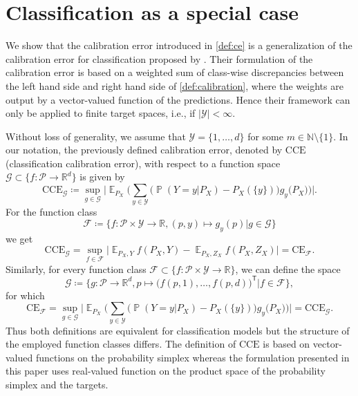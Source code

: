 \documentclass{article}
\DeclareMathOperator{\Prob}{\mathbb{P}}
\DeclareMathOperator{\Exp}{\mathbb{E}}
\begin{document}
\section{Classification as a special case}
\label{app:classification}

We show that the calibration error introduced in
\cref{def:ce} is a generalization of the calibration error
for classification proposed by \citet{Widmann2019}.
Their formulation of the calibration error is based on
a weighted sum of class-wise discrepancies between the
left hand side and right hand side of \cref{def:calibration},
where the weights are output by a vector-valued function
of the predictions. Hence their framework can only be applied to
finite target spaces, i.e., if $|\mathcal{Y}| < \infty$.

Without loss of generality, we assume that
$\mathcal{Y} = \{1, \ldots, d\}$ for some
$m \in \mathbb{N} \setminus \{1\}$. In our notation, the
previously defined calibration error, denoted by
$\mathrm{CCE}$ (classification calibration error), with
respect to a function space
$\mathcal{G} \subset \{f \colon \mathcal{P} \to \mathbb{R}^d\}$
is given by
\begin{equation*}
    \mathrm{CCE}_{\mathcal{G}} \coloneqq \sup_{g \in \mathcal{G}} \bigg| \Exp_{P_X}\bigg(\sum_{y \in \mathcal{Y}} \big(\Prob(Y = y| P_X) - P_X(\{y\})\big) g_y\big(P_X\big) \bigg) \bigg|.
\end{equation*}
For the function class
\begin{equation*}
    \mathcal{F} \coloneqq \big\{f \colon \mathcal{P} \times \mathcal{Y} \to \mathbb{R}, (p, y) \mapsto g_y(p) \big| g \in \mathcal{G}\big\}
\end{equation*}
we get
\begin{equation*}
    \mathrm{CCE}_{\mathcal{G}}
    = \sup_{f \in \mathcal{F}} \big| \Exp_{P_X,Y} f(P_X, Y) - \Exp_{P_X,Z_X} f(P_X, Z_X)\big|
    = \mathrm{CE}_{\mathcal{F}}.
\end{equation*}
Similarly, for every function class
$\mathcal{F} \subset \{f \colon \mathcal{P} \times \mathcal{Y} \to \mathbb{R}\}$,
we can define the space
\begin{equation*}
    \mathcal{G} \coloneqq \Big\{g \colon \mathcal{P} \to \mathbb{R}^d,
    p \mapsto {\big(f(p, 1), \ldots, f(p, d)\big)^\mathsf{T}} \Big| f \in \mathcal{F} \Big\},
\end{equation*}
for which
\begin{equation*}
    \mathrm{CE}_{\mathcal{F}}
    = \sup_{g \in \mathcal{G}} \bigg| \Exp_{P_X}\bigg(\sum_{y \in \mathcal{Y}} \big(\Prob(Y = y| P_X) - P_X(\{y\})\big) g_y\big(P_X\big) \bigg) \bigg|
    = \mathrm{CCE}_{\mathcal{G}}.
\end{equation*}
Thus both definitions are equivalent for classification models but
the structure of the employed function classes differs. The
definition of $\mathrm{CCE}$ is based on vector-valued functions on
the probability simplex whereas the formulation presented in this paper uses
real-valued function on the product space of the probability simplex and
the targets.
\end{document}
